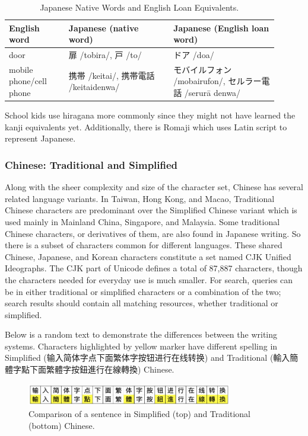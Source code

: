 \documentclass[11pt]{article}
\begin{document}
\begin{table}[h!]
    \centering
    \caption{Japanese Native Words and English Loan Equivalents.}
    \begin{tabular}{p{0.2\linewidth} p{0.35\linewidth} p{0.35\linewidth}}
    \toprule
    \textbf{English word} & \textbf{Japanese (native word)} & \textbf{Japanese (English loan word)} \\
    \midrule
    door & 扉 /tobira/, 戸 /to/ & ドア /doa/ \\
    mobile phone/cell phone & 携帯 /keitai/, 携帯電話 /keitaidenwa/ & モバイルフォン /mobairufon/, セルラー電話 /serurā denwa/ \\
    \bottomrule
    \end{tabular}
    \label{tab:loan_words}
\end{table}

School kids use hiragana more commonly since they might not have learned the kanji equivalents yet. Additionally, there is Romaji which uses Latin script to represent Japanese.

\subsubsection{Chinese: Traditional and Simplified}
Along with the sheer complexity and size of the character set, Chinese has several related language variants. In Taiwan, Hong Kong, and Macao, Traditional Chinese characters are predominant over the Simplified Chinese variant which is used mainly in Mainland China, Singapore, and Malaysia. Some traditional Chinese characters, or derivatives of them, are also found in Japanese writing. So there is a subset of characters common for different languages. These shared Chinese, Japanese, and Korean characters constitute a set named CJK Unified Ideographs. The CJK part of Unicode defines a total of 87,887 characters, though the characters needed for everyday use is much smaller. For search, queries can be in either traditional or simplified characters or a combination of the two; search results should contain all matching resources, whether traditional or simplified.

Below is a random text to demonstrate the differences between the writing systems. Characters highlighted by yellow marker have different spelling in Simplified (输入简体字点下面繁体字按钮进行在线转换) and Traditional (輸入簡體字點下面繁體字按鈕進行在線轉換) Chinese.

\begin{figure}[h!]
    \centering
    \includegraphics[width=0.8\textwidth]{Screen-Shot-2019-08-19-at-6.39.18-AM.png}
    \caption{Comparison of a sentence in Simplified (top) and Traditional (bottom) Chinese.}
    \label{fig:simplified_traditional}
\end{figure}
\end{document}
